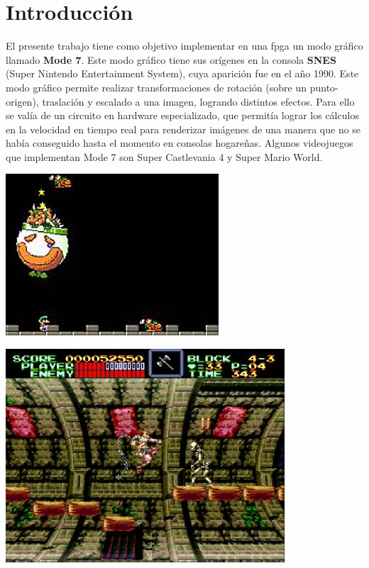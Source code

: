 \section{Introducción}
El presente trabajo tiene como objetivo implementar en una fpga un modo gráfico llamado \textbf{Mode 7}. Este modo gráfico tiene sus orígenes en la consola \textbf{SNES} (Super Nintendo Entertainment System), cuya aparición fue en el año 1990. Este modo gráfico permite realizar transformaciones de rotación (sobre un punto-origen), traslación y escalado a una imagen, logrando distintos efectos. Para ello se valía de un circuito en hardware especializado, que permitía lograr los cálculos en la velocidad en tiempo real para renderizar imágenes de una manera que no se había conseguido hasta el momento en consolas hogareñas. Algunos videojuegos que implementan Mode 7 son Super Castlevania 4 y Super Mario World.

\centerline{\includegraphics[scale=0.5]{mario.jpg}}
\centerline{\includegraphics[scale=0.5]{castlevania.jpg}}   
